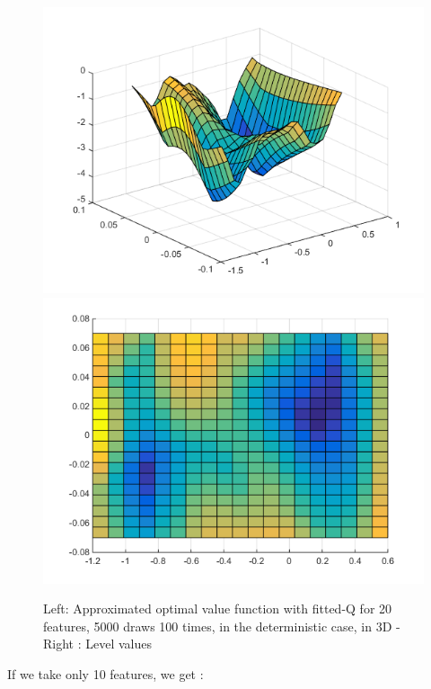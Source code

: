 \documentclass[a4paper, 12pt]{article}
\begin{document}
\begin{figure}[H]
	\centering
	\noindent\includegraphics[scale=0.3]{fittedQ-5ep-5000draws-deterministic.png}
	\noindent\includegraphics[scale=0.3]{fittedQ-5ep-5000draws-deterministic-levels.png}
	\caption{Left: Approximated optimal value function with fitted-Q for 20 features, 5000 draws 100 times, in the deterministic case, in 3D - Right : Level values}
\end{figure}

If we take only 10 features, we get :
\end{document}
